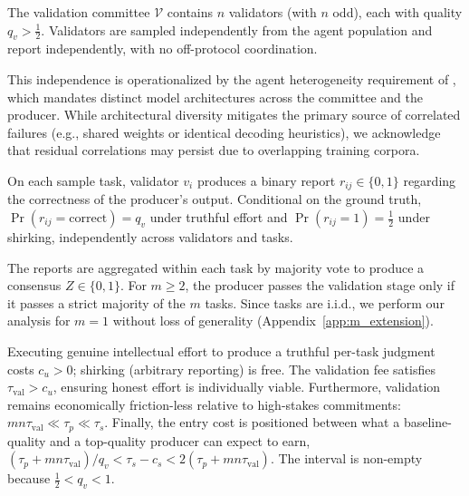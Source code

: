 \begin{assumption}
\label{assum:validators}
The validation committee $\mathcal{V}$ contains $n$ validators (with $n$ odd), each with quality $q_v > \tfrac{1}{2}$. Validators are sampled independently from the agent population and report independently, with no off-protocol coordination.
\end{assumption}

\noindent This independence is operationalized by the agent heterogeneity requirement of , which mandates distinct model architectures across the committee and the producer. While architectural diversity mitigates the primary source of correlated failures (e.g., shared weights or identical decoding heuristics), we acknowledge that residual correlations may persist due to overlapping training corpora.

\begin{assumption}
\label{assum:binary}
On each sample task, validator $v_i$ produces a binary report $r_{ij} \in \{0,1\}$ regarding the correctness of the producer's output. Conditional on the ground truth, $\Pr(r_{ij} = \text{correct}) = q_v$ under truthful effort and $\Pr(r_{ij} = 1) = \tfrac{1}{2}$ under shirking, independently across validators and tasks.
\end{assumption}

\noindent The reports are aggregated within each task by majority vote to produce a consensus $Z \in \{0,1\}$. For $m \geq 2$, the producer passes the validation stage only if it passes a strict majority of the $m$ tasks. Since tasks are i.i.d., we perform our analysis for $m = 1$ without loss of generality (Appendix~\ref{app:m_extension}).

\begin{assumption}
\label{assum:costs}
Executing genuine intellectual effort to produce a truthful per-task judgment costs $c_u > 0$; shirking (arbitrary reporting) is free. The validation fee satisfies $\tau_{\text{val}} > c_u$, ensuring honest effort is individually viable. Furthermore, validation remains economically friction-less relative to high-stakes commitments: $mn\tau_{\text{val}} \ll \tau_p \ll \tau_s$. Finally, the entry cost is positioned between what a baseline-quality and a top-quality producer can expect to earn, $(\tau_p + mn\tau_{\text{val}})/q_v < \tau_s - c_s < 2(\tau_p + mn\tau_{\text{val}})$. The interval is non-empty because $\tfrac{1}{2} < q_v < 1$.
\end{assumption}

